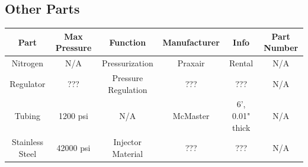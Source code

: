 \documentclass[9pt]{article} %
\numberwithin{equation}{section} %
\begin{document}
\subsection{Other Parts}
\begin{center}
 \begin{tabular}{|c c c c c c|} 
 \hline
 Part & Max Pressure & Function & Manufacturer & Info & Part Number\\
 \hline\hline
 Nitrogen & N/A & Pressurization & Praxair & Rental & N/A\\ 
 \hline
 Regulator & ??? & Pressure Regulation & ??? & ??? & N/A\\
 \hline
 Tubing & 1200 psi & N/A & McMaster & 6', 0.01" thick & N/A\\
 \hline
 Stainless Steel & 42000 psi & Injector Material & ??? & ??? & N/A\\ [0.5ex]
 \hline
\end{tabular}
\end{center}
\end{document}
